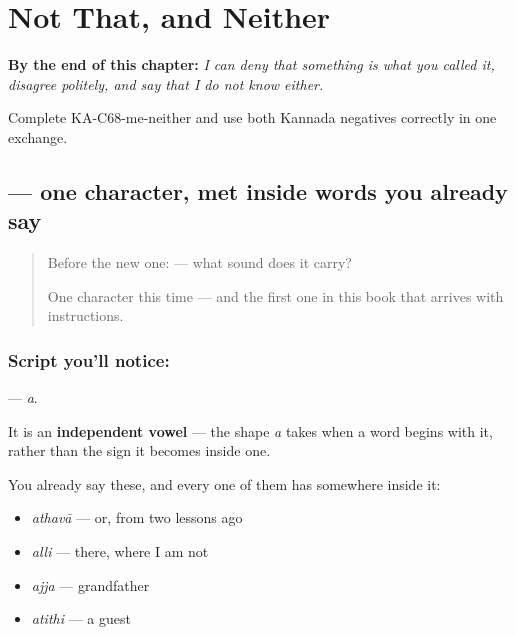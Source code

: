 
\chapter{Not That, and Neither}
\label{ch:ka-not-that}

\begin{chapteropening}
\textbf{By the end of this chapter:} \emph{I can deny that something is what you called it, disagree politely, and say that I do not know either.}

Complete KA-C68-me-neither and use both Kannada negatives correctly in one exchange.
\end{chapteropening}

\section[\texorpdfstring{\kn{ಅ} (a)}{ಅ (a)}]{ — one character, met inside words you already say}

\label{lesson:KA-S135-letter-a}



\begin{quote}
Before the new one:  — what sound does it carry?

One character this time — and the first one in this book that arrives with instructions.
\end{quote}

\subsection*{Script you'll notice: }
\textbf{} — \emph{a}.

It is an \textbf{independent vowel} — the shape \emph{a} takes when a word begins with it, rather than the sign it becomes inside one.

You already say these, and every one of them has  somewhere inside it:

\begin{itemize}
\raggedright
  \item \textbf{} \emph{athavā} — or, from two lessons ago
  \item \textbf{} \emph{alli} — there, where I am not
  \item \textbf{} \emph{ajja} — grandfather
  \item \textbf{} \emph{atithi} — a guest
\end{itemize}

